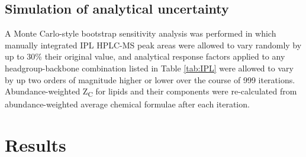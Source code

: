 \subsection{Simulation of analytical uncertainty} A Monte Carlo-style bootstrap sensitivity analysis was performed in which manually integrated IPL HPLC-MS peak areas were allowed to vary randomly by up to 30\% their original value, and analytical response factors applied to any headgroup-backbone combination listed in Table \ref{tab:IPL} were allowed to vary by up two orders of magnitude higher or lower over the course of 999 iterations. Abundance-weighted Z\textsubscript{C} for lipids and their components were re-calculated from abundance-weighted average chemical formulae after each iteration.


\section{Results}

